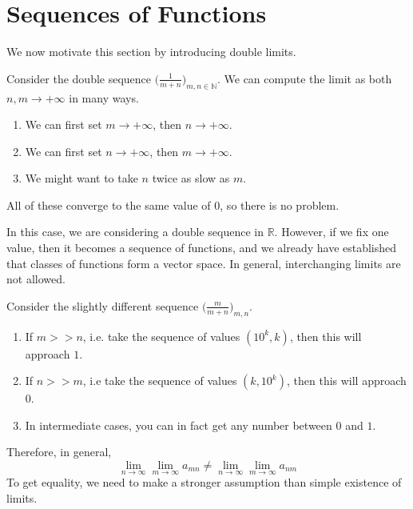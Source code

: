 \section{Sequences of Functions}

  We now motivate this section by introducing double limits. 

  \begin{example}[Double]
    Consider the double sequence $\big( \frac{1}{m + n} \big)_{m, n \in \mathbb{N}}$. We can compute the limit as both $n, m \to +\infty$ in many ways. 
    \begin{enumerate}
      \item We can first set $m \to +\infty$, then $n \to +\infty$. 
      \item We can first set $n \to +\infty$, then $m \to +\infty$. 
      \item We might want to take $n$ twice as slow as $m$. 
    \end{enumerate}
    All of these converge to the same value of $0$, so there is no problem. 
  \end{example}

  In this case, we are considering a double sequence in $\mathbb{R}$. However, if we fix one value, then it becomes a sequence of functions, and we already have established that classes of functions form a vector space. In general, interchanging limits are not allowed. 

  \begin{example}
    Consider the slightly different sequence $\big( \frac{m}{m + n} \big)_{m, n}$. 
    \begin{enumerate}
      \item If $m >> n$, i.e. take the sequence of values $(10^k, k)$, then this will approach $1$. 
      \item If $n >> m$, i.e take the sequence of values $(k, 10^k)$, then this will approach $0$. 
      \item In intermediate cases, you can in fact get any number between $0$ and $1$. 
    \end{enumerate}
  \end{example}

  Therefore, in general, 
  \begin{equation}
    \lim_{n \to \infty} \lim_{m \to \infty} a_{mn} \neq \lim_{n \to \infty} \lim_{m \to \infty} a_{nm}
  \end{equation}
  To get equality, we need to make a stronger assumption than simple existence of limits. 

